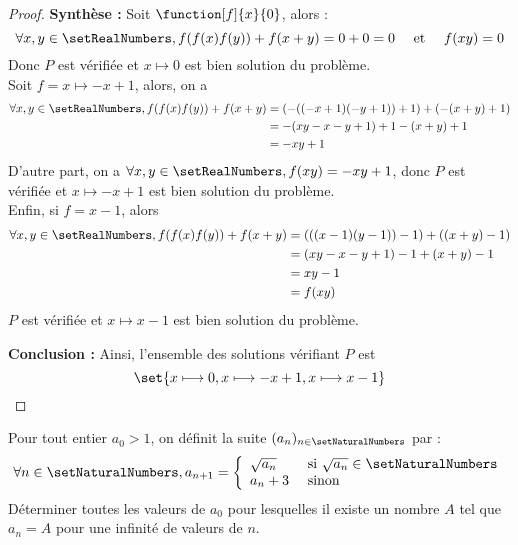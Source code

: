 \begin{proof}
\textbf{Synthèse :} Soit $\function[f]{x}{0}$, alors :
\[
\forall x, y \in \setRealNumbers, f(f(x)f(y))+f(x+y) = 0 + 0 = 0 \quad\text{ et }\quad f(xy) = 0
\]
Donc $P$ est vérifiée et $x \longmapsto 0$ est bien solution du problème.\\
Soit $f = x \longmapsto - x + 1$, alors, on a 
\[
\begin{aligned}
\forall x, y \in \setRealNumbers, 
f(f(x)f(y))+f(x+y) 
&= (-((- x + 1)(- y + 1)) + 1) + (-(x+y) + 1)\\
&= -(xy - x - y + 1) + 1 -(x+y) + 1\\
&= -xy  + 1
\end{aligned}
\]
D'autre part, on a $\forall x, y \in \setRealNumbers, f(xy) = - xy + 1$, donc $P$ est vérifiée et $x \longmapsto - x + 1$ est bien solution du problème.\\ 
Enfin, si $f = x - 1$, alors
\[
\begin{aligned}
\forall x, y \in \setRealNumbers, 
f(f(x)f(y))+f(x+y) 
&= (((x - 1)(y - 1)) - 1) + ((x+y) - 1)\\
&= (xy - x - y + 1) - 1 +(x+y) - 1\\
&= xy  - 1 \\
&= f(xy)
\end{aligned}
\]
$P$ est vérifiée et $x \longmapsto x - 1$ est bien solution du problème.

\textbf{Conclusion :} Ainsi, l'ensemble des solutions vérifiant $P$ est \[
\set{x \longmapsto 0, x \longmapsto - x + 1, x \longmapsto x - 1}
\]
\end{proof}

\begin{exercice}
Pour tout entier $a_0 > 1$, on définit la suite $(a_n)_{n \in \setNaturalNumbers}$ par :
\[
\forall n \in \setNaturalNumbers, a_{n+1} = 
\left\{
\begin{array}{l l}
\sqrt{a_n} &\text{ si }  \sqrt{a_{n}} \in \setNaturalNumbers\\
a_{n} + 3  &\text{ sinon}\\
\end{array} 
\right.
\]
Déterminer toutes les valeurs de $a_0$ pour lesquelles il existe un nombre $A$ tel que $a_n = A$ pour une infinité de valeurs de $n$.
\end{exercice}

